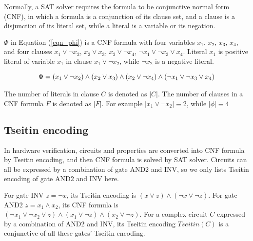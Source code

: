 \documentclass[runningheads,a4paper]{llncs}
\begin{document}
Normally, 
a SAT solver requires the formula to be  conjunctive normal form (CNF), 
in which a formula is a conjunction of its clause set, 
and a clause is a disjunction of its literal set, 
while a literal is a variable or its negation.


$\Phi$ in Equation (\ref{eqn_phi}) is a CNF formula 
with four variables $x_1$, $x_2$, $x_3$, $x_4$, 
and four clauses $x_1\vee \neg x_2$, $x_2\vee x_3$, $x_2\vee \neg x_4$, $ \neg x_1\vee \neg x_3\vee x_4$.
Literal $x_1$ is positive literal of variable $x_1$ in clause $x_1\vee \neg x_2$,
while $ \neg x_2$ is a negative literal.

\begin{equation}\label{eqn_phi}
\centering \Phi=(x_1\vee \neg x_2)\wedge(x_2\vee x_3)\wedge(x_2\vee \neg x_4)\wedge( \neg x_1\vee \neg x_3\vee x_4)
\end{equation}

The number of literals in clause $C$ is denoted as $|C|$.
The number of clauses in a CNF formula $F$ is denoted as $|F|$.
For example $| x_1\vee  \neg x_2 |\equiv 2$,
while $|\phi|\equiv 4$

\subsection{Tseitin encoding}

In hardware verification, 
circuits and properties are converted into CNF formula by Tseitin encoding\cite{t4},
and then CNF formula is solved by SAT solver.
Circuits can all be expressed by a combination of gate AND2 and INV, 
so we only lists Tseitin encoding of gate AND2 and INV here. 

For gate INV $z=\neg x$, 
its Tseitin encoding is  $(x\vee z)\wedge( \neg x\vee \neg z)$.
For gate AND2 $z=x_1\wedge x_2$, 
its CNF formula is $( \neg x_1\vee \neg x_2\vee z)\wedge(x_1\vee \neg z) \wedge(x_2\vee \neg z)$.
For a complex circuit $C$ expressed by a combination of AND2 and INV, 
its Tseitin encoding $Tseitin(C)$ is a conjunctive of all these gates' Tseitin encoding.

% 
\end{document}
